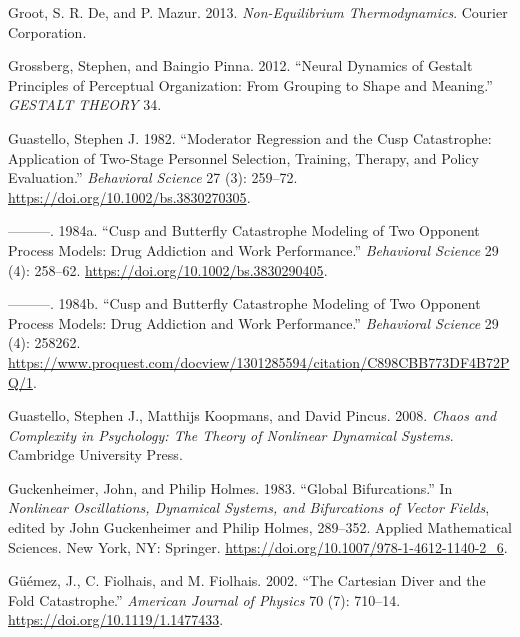 \documentclass[
  letterpaper,
]{scrbook}
\newlength{\cslhangindent}
\newlength{\cslentryspacingunit} %
\newenvironment{CSLReferences}[2] %
 {%
  \setlength{\parindent}{0pt}
  \ifodd #1
  \let\oldpar\par
  \def\par{\hangindent=\cslhangindent\oldpar}
  \fi
  \setlength{\parskip}{#2\cslentryspacingunit}
 }%
 {}
\begin{document}
\begin{CSLReferences}{1}{0}
\leavevmode{}%
Groot, S. R. De, and P. Mazur. 2013. \emph{Non-Equilibrium
Thermodynamics}. Courier Corporation.

\leavevmode{}%
Grossberg, Stephen, and Baingio Pinna. 2012. {``Neural {Dynamics} of
{Gestalt Principles} of {Perceptual Organization}: {From Grouping} to
{Shape} and {Meaning}.''} \emph{GESTALT THEORY} 34.

\leavevmode{}%
Guastello, Stephen J. 1982. {``Moderator Regression and the Cusp
Catastrophe: {Application} of Two-Stage Personnel Selection, Training,
Therapy, and Policy Evaluation.''} \emph{Behavioral Science} 27 (3):
259--72. \url{https://doi.org/10.1002/bs.3830270305}.

\leavevmode{}%
---------. 1984a. {``Cusp and Butterfly Catastrophe Modeling of Two
Opponent Process Models: {Drug} Addiction and Work Performance.''}
\emph{Behavioral Science} 29 (4): 258--62.
\url{https://doi.org/10.1002/bs.3830290405}.

\leavevmode{}%
---------. 1984b. {``Cusp and Butterfly Catastrophe Modeling of Two
Opponent Process Models: Drug Addiction and Work Performance.''}
\emph{Behavioral Science} 29 (4): 258262.
\url{https://www.proquest.com/docview/1301285594/citation/C898CBB773DF4B72PQ/1}.

\leavevmode{}%
Guastello, Stephen J., Matthijs Koopmans, and David Pincus. 2008.
\emph{Chaos and {Complexity} in {Psychology}: {The Theory} of {Nonlinear
Dynamical Systems}}. {Cambridge University Press}.

\leavevmode{}%
Guckenheimer, John, and Philip Holmes. 1983. {``Global
{Bifurcations}.''} In \emph{Nonlinear {Oscillations}, {Dynamical
Systems}, and {Bifurcations} of {Vector Fields}}, edited by John
Guckenheimer and Philip Holmes, 289--352. Applied {Mathematical
Sciences}. {New York, NY}: {Springer}.
\url{https://doi.org/10.1007/978-1-4612-1140-2_6}.

\leavevmode{}%
Güémez, J., C. Fiolhais, and M. Fiolhais. 2002. {``The {Cartesian} Diver
and the Fold Catastrophe.''} \emph{American Journal of Physics} 70 (7):
710--14. \url{https://doi.org/10.1119/1.1477433}.


\end{CSLReferences}
\end{document}
